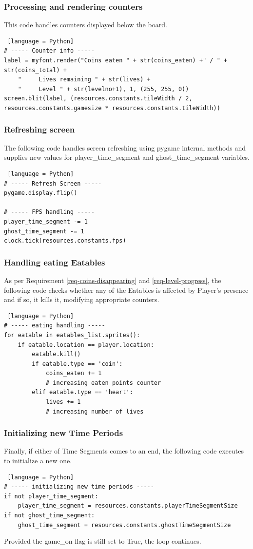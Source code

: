 \documentclass[11pt,a4paper,notitlepage]{report}
\begin{document}
				\subsubsection{Processing and rendering counters}
					This code handles counters displayed below the board.
					\begin{lstlisting} [language = Python]	
# ----- Counter info -----
label = myfont.render("Coins eaten " + str(coins_eaten) +" / " + str(coins_total) +
	"     Lives remaining " + str(lives) +
	"     Level " + str(levelno+1), 1, (255, 255, 0))
screen.blit(label, (resources.constants.tileWidth / 2, resources.constants.gamesize * resources.constants.tileWidth))
					\end{lstlisting}
				\subsubsection{Refreshing screen}
					The following code handles screen refreshing using pygame internal methods and supplies new values for player\_time\_segment and ghost\_time\_segment variables.
					\begin{lstlisting} [language = Python]
# ----- Refresh Screen -----
pygame.display.flip()

# ----- FPS handling -----
player_time_segment -= 1
ghost_time_segment -= 1
clock.tick(resources.constants.fps)
					\end{lstlisting}
				\subsubsection{Handling eating Eatables}
					As per Requirement \ref{req-coins-disappearing} and \ref{req-level-progress}, the following code checks whether any of the Eatables is affected by Player's presence and if so, it kills it, modifying appropriate counters.
					\begin{lstlisting} [language = Python]
# ----- eating handling -----
for eatable in eatables_list.sprites():
	if eatable.location == player.location:
		eatable.kill()
		if eatable.type == 'coin':
			coins_eaten += 1
			# increasing eaten points counter
		elif eatable.type == 'heart':
			lives += 1
			# increasing number of lives
					\end{lstlisting}
				\subsubsection{Initializing new Time Periods}
					Finally, if either of Time Segments comes to an end, the following code executes to initialize a new one.
					\begin{lstlisting} [language = Python]
# ----- initializing new time periods -----
if not player_time_segment:
	player_time_segment = resources.constants.playerTimeSegmentSize
if not ghost_time_segment:
	ghost_time_segment = resources.constants.ghostTimeSegmentSize
					\end{lstlisting}
				Provided the game\_on flag is still set to True, the loop continues.
				\linebreak
				
\end{document}
